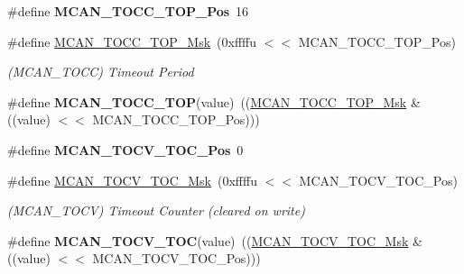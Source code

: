 \begin{DoxyCompactItemize}
\#define {\bfseries M\+C\+A\+N\+\_\+\+T\+O\+C\+C\+\_\+\+T\+O\+P\+\_\+\+Pos}~16
\item 
\mbox{\label{group__SAME70__MCAN_gae5b467deea06161dad9c03db7838b3bb}} 
\#define \mbox{\hyperlink{group__SAME70__MCAN_gae5b467deea06161dad9c03db7838b3bb}{M\+C\+A\+N\+\_\+\+T\+O\+C\+C\+\_\+\+T\+O\+P\+\_\+\+Msk}}~(0xffffu $<$$<$ M\+C\+A\+N\+\_\+\+T\+O\+C\+C\+\_\+\+T\+O\+P\+\_\+\+Pos)
\begin{DoxyCompactList}\small\item\em (M\+C\+A\+N\+\_\+\+T\+O\+CC) Timeout Period \end{DoxyCompactList}\item 
\mbox{\label{group__SAME70__MCAN_gae192b8b0e7ccc8e903c27fb6302af1c0}} 
\#define {\bfseries M\+C\+A\+N\+\_\+\+T\+O\+C\+C\+\_\+\+T\+OP}(value)~((\mbox{\hyperlink{group__SAMV71__MCAN_gae5b467deea06161dad9c03db7838b3bb}{M\+C\+A\+N\+\_\+\+T\+O\+C\+C\+\_\+\+T\+O\+P\+\_\+\+Msk}} \& ((value) $<$$<$ M\+C\+A\+N\+\_\+\+T\+O\+C\+C\+\_\+\+T\+O\+P\+\_\+\+Pos)))
\item 
\mbox{\label{group__SAME70__MCAN_ga9b55684ffe1764ea1a51bbcc5590790c}} 
\#define {\bfseries M\+C\+A\+N\+\_\+\+T\+O\+C\+V\+\_\+\+T\+O\+C\+\_\+\+Pos}~0
\item 
\mbox{\label{group__SAME70__MCAN_gad85d6aea1ff1f7f67073ce2494e37452}} 
\#define \mbox{\hyperlink{group__SAME70__MCAN_gad85d6aea1ff1f7f67073ce2494e37452}{M\+C\+A\+N\+\_\+\+T\+O\+C\+V\+\_\+\+T\+O\+C\+\_\+\+Msk}}~(0xffffu $<$$<$ M\+C\+A\+N\+\_\+\+T\+O\+C\+V\+\_\+\+T\+O\+C\+\_\+\+Pos)
\begin{DoxyCompactList}\small\item\em (M\+C\+A\+N\+\_\+\+T\+O\+CV) Timeout Counter (cleared on write) \end{DoxyCompactList}\item 
\mbox{\label{group__SAME70__MCAN_gaa0f268eeade7bd9012b7e5828f511ba3}} 
\#define {\bfseries M\+C\+A\+N\+\_\+\+T\+O\+C\+V\+\_\+\+T\+OC}(value)~((\mbox{\hyperlink{group__SAMV71__MCAN_gad85d6aea1ff1f7f67073ce2494e37452}{M\+C\+A\+N\+\_\+\+T\+O\+C\+V\+\_\+\+T\+O\+C\+\_\+\+Msk}} \& ((value) $<$$<$ M\+C\+A\+N\+\_\+\+T\+O\+C\+V\+\_\+\+T\+O\+C\+\_\+\+Pos)))
\item 
\mbox{\label{group__SAME70__MCAN_ga56731c3f59868ca6504a7b18c20d9dac}} 

\end{DoxyCompactItemize}
